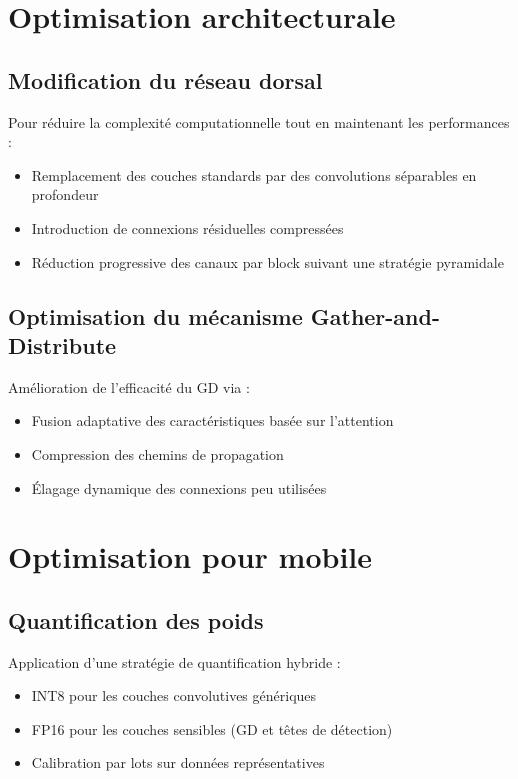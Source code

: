 \begin{onehalfspace}
\section{Optimisation architecturale}

\subsection{Modification du réseau dorsal}
\hspace{0.65cm} Pour réduire la complexité computationnelle tout en maintenant les performances :
\begin{itemize}
    \item Remplacement des couches standards par des convolutions séparables en profondeur
    \item Introduction de connexions résiduelles compressées
    \item Réduction progressive des canaux par block suivant une stratégie pyramidale
\end{itemize}

\subsection{Optimisation du mécanisme Gather-and-Distribute}
\hspace{0.65cm} Amélioration de l'efficacité du GD via :
\begin{itemize}
    \item Fusion adaptative des caractéristiques basée sur l'attention
    \item Compression des chemins de propagation
    \item Élagage dynamique des connexions peu utilisées
\end{itemize}

\section{Optimisation pour mobile}

\subsection{Quantification des poids}
\hspace{0.65cm} Application d'une stratégie de quantification hybride :
\begin{itemize}
    \item INT8 pour les couches convolutives génériques
    \item FP16 pour les couches sensibles (GD et têtes de détection)
    \item Calibration par lots sur données représentatives
\end{itemize}


\end{onehalfspace}
